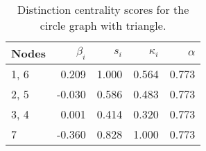 \begin{table}
\centering
\caption{\label{tab:circletriangle}Distinction centrality scores for the circle graph with triangle.}
\centering
\begin{tabular}[t]{lrrrr}
\toprule
Nodes & $\beta_i$ & $s_i$ & $\kappa_i$ & $\alpha$\\
\midrule
1, 6 & 0.209 & 1.000 & 0.564 & 0.773\\
2, 5 & -0.030 & 0.586 & 0.483 & 0.773\\
3, 4 & 0.001 & 0.414 & 0.320 & 0.773\\
7 & -0.360 & 0.828 & 1.000 & 0.773\\
\bottomrule
\end{tabular}
\end{table}
